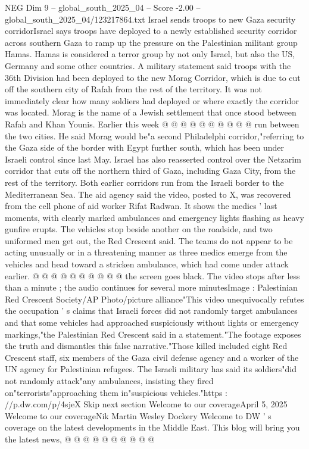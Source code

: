 \begin{textsample}{NEG Dim 9 – global\_south\_2025\_04 – Score -2.00 – global\_south\_2025\_04/123217864.txt}
Israel sends troops to new Gaza security corridorIsrael says troops have deployed to a newly established security corridor across southern Gaza to ramp up the pressure on the Palestinian militant group Hamas.
Hamas is considered a terror group by not only Israel, but also the US, Germany and some other countries.
A military statement said troops with the 36th Division had been deployed to the new Morag Corridor, which is due to cut off the southern city of Rafah from the rest of the territory.
It was not immediately clear how many soldiers had deployed or where exactly the corridor was located.
Morag is the name of a Jewish settlement that once stood between Rafah and Khan Younis.
Earlier this week @ @ @ @ @ @ @ @ @ @ run between the two cities.
He said Morag would be"a second Philadelphi corridor,"referring to the Gaza side of the border with Egypt further south, which has been under Israeli control since last May.
Israel has also reasserted control over the Netzarim corridor that cuts off the northern third of Gaza, including Gaza City, from the rest of the territory.
Both earlier corridors run from the Israeli border to the Mediterranean Sea.
The aid agency said the video, posted to X, was recovered from the cell phone of aid worker Rifat Radwan.
It shows the medics ' last moments, with clearly marked ambulances and emergency lights flashing as heavy gunfire erupts.
The vehicles stop beside another on the roadside, and two uniformed men get out, the Red Crescent said.
The teams do not appear to be acting unusually or in a threatening manner as three medics emerge from the vehicles and head toward a stricken ambulance, which had come under attack earlier. @ @ @ @ @ @ @ @ @ @ the screen goes black.
The video stops after less than a minute ; the audio continues for several more minutesImage : Palestinian Red Crescent Society/AP Photo/picture alliance"This video unequivocally refutes the occupation ' s claims that Israeli forces did not randomly target ambulances and that some vehicles had approached suspiciously without lights or emergency markings,"the Palestinian Red Crescent said in a statement."The footage exposes the truth and dismantles this false narrative."Those killed included eight Red Crescent staff, six members of the Gaza civil defense agency and a worker of the UN agency for Palestinian refugees.
The Israeli military has said its soldiers"did not randomly attack"any ambulances, insisting they fired on"terrorists"approaching them in"suspicious vehicles."https : //p.dw.com/p/4sjeX Skip next section Welcome to our coverageApril 5, 2025 Welcome to our coverageNik Martin Wesley Dockery Welcome to DW ' s coverage on the latest developments in the Middle East.
This blog will bring you the latest news, @ @ @ @ @ @ @ @ @ @

\end{textsample}

